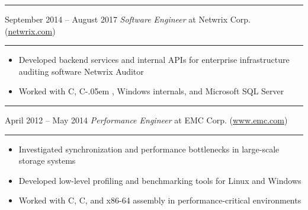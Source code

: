 \documentclass[12pt]{article}
\newcommand\CXX{C\nolinebreak[4]\hspace{-.05em}\raisebox{.4ex}{\relsize{-3}{\textbf{++}}}}
\newcommand{\Csharp}{%
  {\settoheight{\dimen0}{C}C\kern-.05em \resizebox{!}{\dimen0}{\raisebox{\depth}{\#}}}}
\newcommand\CvSmallSkipLength{0.5em}
\newcommand\CvBigSkipLength{1em}
\newcommand\CvSkip[1]{\vspace{#1}}
\newcommand\CvSmallSkip{\CvSkip{\CvSmallSkipLength}}
\newcommand\CvBigSkip{\CvSkip{\CvBigSkipLength}}
\newcommand\CvSectionHeader[1]{\CvBigSkip\textbf{#1}\CvBigSkip}
\newcommand\CvRule{\begingroup\color{CvRuleColor}\hrule\endgroup}
\newcommand\CvWorkplaceHeader[5]{
  \begingroup%
    \CvRule\nopagebreak%
    \fboxsep0pt%
    \colorbox{CvWorkplaceHeaderColor}{%
      \begin{minipage}{\linewidth-2\fboxsep}%
\CvSmallSkip%
#1 -- #2 \hfill \textit{#3} at #4 (\href{http://#5/}{#5})%
\CvSmallSkip%
      \end{minipage}%
    }%
    \CvRule%
  \endgroup%
}
\newenvironment{CvWorkplaceDescription}{%
    \begingroup\setlength\parskip{\CvSmallSkipLength}%
  }{%
    \CvSmallSkip\endgroup%
  }
\begin{document}
\CvWorkplaceHeader{September 2014}{August 2017}{Software Engineer}{Netwrix Corp.}{netwrix.com}

\begin{CvWorkplaceDescription}
\begin{itemize}[noitemsep]
  \item Developed backend services and internal APIs for enterprise infrastructure auditing software Netwrix Auditor
  \item Worked with \CXX, \Csharp, Windows internals, and Microsoft SQL Server
\end{itemize}
\end{CvWorkplaceDescription}

\CvWorkplaceHeader{April 2012}{May 2014}{Performance Engineer}{EMC Corp.}{www.emc.com}

\begin{CvWorkplaceDescription}
\begin{itemize}[noitemsep]
  \item Investigated synchronization and performance bottlenecks in large-scale storage systems
  \item Developed low-level profiling and benchmarking tools for Linux and Windows
  \item Worked with \CXX, C, and x86-64 assembly in performance-critical environments
\end{itemize}
\end{CvWorkplaceDescription}

\end{document}
